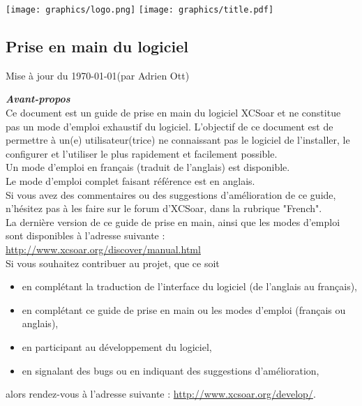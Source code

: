 \documentclass{article}
\begin{document}
%
\begin{center}
\texttt{[image: graphics/logo.png]}
\vskip 0.5cm
\texttt{[image: graphics/title.pdf]}
\subsection*{Prise en main du logiciel}
\end{center}
%
\begin{flushright}
Mise à jour du \today \space(par Adrien Ott)
\end{flushright}
%
\pagebreak
\noindent
\textbf{\textit{Avant-propos}}\\
\newline
Ce document est un guide de prise en main du logiciel XCSoar et ne constitue pas un mode d'emploi exhaustif du logiciel. L'objectif de ce document est de permettre à un(e) utilisateur(trice) ne connaissant pas le logiciel de l'installer, le configurer et l'utiliser le plus rapidement et facilement possible.\\Un mode d'emploi en français (traduit de l'anglais) est disponible.\\Le mode d'emploi complet faisant référence est en anglais.\\Si vous avez des commentaires ou des suggestions d'amélioration de ce guide, n'hésitez pas à les faire sur le forum d'XCSoar, dans la rubrique "French".\\
\newline
La dernière version de ce guide de prise en main, ainsi que les modes d'emploi sont disponibles à l'adresse suivante : \url{http://www.xcsoar.org/discover/manual.html}\\
\newline
Si vous souhaitez contribuer au projet, que ce soit
\begin{itemize}
\item en complétant la traduction de l'interface du logiciel (de l'anglais au français),
\item en complétant ce guide de prise en main ou les modes d'emploi (français ou anglais),
\item en participant au développement du logiciel,
\item en signalant des bugs ou en indiquant des suggestions d'amélioration,
\end{itemize}
alors rendez-vous à l'adresse suivante : \url{http://www.xcsoar.org/develop/}.\\
%
\end{document}
